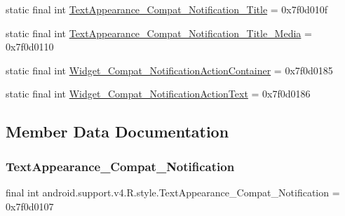 \begin{DoxyCompactItemize}
\item 
static final int \mbox{\hyperlink{classandroid_1_1support_1_1v4_1_1R_1_1style_abd0415a4a076895003fdd5225714ac5e}{Text\+Appearance\+\_\+\+Compat\+\_\+\+Notification\+\_\+\+Title}} = 0x7f0d010f
\item 
static final int \mbox{\hyperlink{classandroid_1_1support_1_1v4_1_1R_1_1style_af43042c3c4d5c7ee7bf37d7e5d83a782}{Text\+Appearance\+\_\+\+Compat\+\_\+\+Notification\+\_\+\+Title\+\_\+\+Media}} = 0x7f0d0110
\item 
static final int \mbox{\hyperlink{classandroid_1_1support_1_1v4_1_1R_1_1style_ae7a59515daffd62d63d4d9475b90c375}{Widget\+\_\+\+Compat\+\_\+\+Notification\+Action\+Container}} = 0x7f0d0185
\item 
static final int \mbox{\hyperlink{classandroid_1_1support_1_1v4_1_1R_1_1style_a51a891758c56519bd50080855ee1453b}{Widget\+\_\+\+Compat\+\_\+\+Notification\+Action\+Text}} = 0x7f0d0186
\end{DoxyCompactItemize}


\subsection{Member Data Documentation}
\mbox{\label{classandroid_1_1support_1_1v4_1_1R_1_1style_ac94662c8dd52c4f6a0fbee17e0eb54ff}} 
\subsubsection{\texorpdfstring{Text\+Appearance\+\_\+\+Compat\+\_\+\+Notification}{TextAppearance\_Compat\_Notification}}
{\footnotesize\ttfamily final int android.\+support.\+v4.\+R.\+style.\+Text\+Appearance\+\_\+\+Compat\+\_\+\+Notification = 0x7f0d0107\hspace{0.3cm}{\ttfamily [static]}}

\mbox{\label{classandroid_1_1support_1_1v4_1_1R_1_1style_a0e51b06e195b1fb1e838fe2f5e7ae7e9}} 
